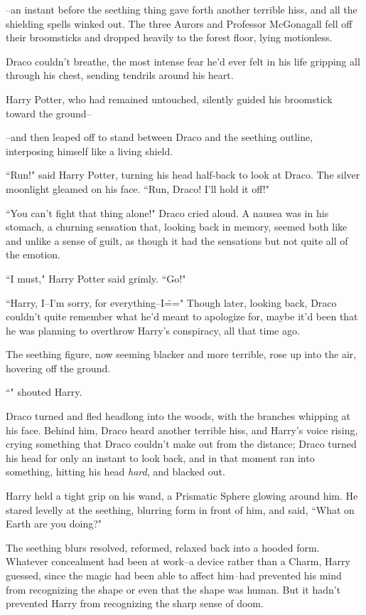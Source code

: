 \begin{em}
\---an instant before the seething thing gave forth another terrible hiss, and all the shielding spells winked out. The three Aurors and Professor McGonagall fell off their broomsticks and dropped heavily to the forest floor, lying motionless.

Draco couldn't breathe, the most intense fear he'd ever felt in his life gripping all through his chest, sending tendrils around his heart.

Harry Potter, who had remained untouched, silently guided his broomstick toward the ground\---

\---and then leaped off to stand between Draco and the seething outline, interposing himself like a living shield.

``Run!" said Harry Potter, turning his head half-back to look at Draco. The silver moonlight gleamed on his face. ``Run, Draco! I'll hold it off!"

``You can't fight that thing alone!" Draco cried aloud. A nausea was in his stomach, a churning sensation that, looking back in memory, seemed both like and unlike a sense of guilt, as though it had the sensations but not quite all of the emotion.

``I must," Harry Potter said grimly. ``Go!"

``Harry, I\---I'm sorry, for everything\---I\===" Though later, looking back, Draco couldn't quite remember what he'd meant to apologize for, maybe it'd been that he was planning to overthrow Harry's conspiracy, all that time ago.

The seething figure, now seeming blacker and more terrible, rose up into the air, hovering off the ground.

``" shouted Harry.

Draco turned and fled headlong into the woods, with the branches whipping at his face. Behind him, Draco heard another terrible hiss, and Harry's voice rising, crying something that Draco couldn't make out from the distance; Draco turned his head for only an instant to look back, and in that moment ran into something, hitting his head \emph{hard}, and blacked out.
\end{em}

\later

Harry held a tight grip on his wand, a Prismatic Sphere glowing around him. He stared levelly at the seething, blurring form in front of him, and said, ``What on Earth are you doing?"

The seething blurs resolved, reformed, relaxed back into a hooded form. Whatever concealment had been at work\---a device rather than a Charm, Harry guessed, since the magic had been able to affect him\---had prevented his mind from recognizing the shape or even that the shape was human. But it hadn't prevented Harry from recognizing the sharp sense of doom.

